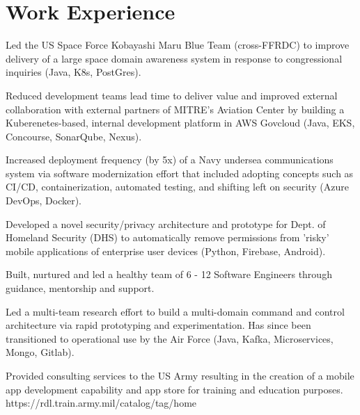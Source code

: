 \documentclass[]{deedy-resume-openfont}
\begin{document}
\section{Work Experience}
\hfill {}
\begin{tightemize}
	\item Led the US Space Force Kobayashi Maru Blue Team (cross-FFRDC) to improve delivery of a large space domain awareness system in response to congressional inquiries (Java, K8s, PostGres).   
	\item Reduced development teams lead time to deliver value and improved external collaboration with external partners of MITRE's Aviation Center by building a Kuberenetes-based, internal development platform in AWS Govcloud (Java, EKS, Concourse, SonarQube, Nexus).  
    \item Increased deployment frequency (by 5x) of a Navy undersea communications system via software modernization effort that included adopting concepts such as CI/CD, containerization, automated testing, and shifting left on security (Azure DevOps, Docker).
	\item Developed a novel security/privacy architecture and prototype for Dept. of Homeland Security (DHS) to automatically remove permissions from 'risky' mobile applications of enterprise user devices (Python, Firebase, Android).
\end{tightemize}
\sectionsep
{}\hfill {}
\begin{tightemize}
	\item Built, nurtured and led a healthy team of 6 - 12 Software Engineers through guidance, mentorship and support.
\end{tightemize}
\sectionsep
{}\hfill {}
\begin{tightemize}
	\item Led a multi-team research effort to build a multi-domain command and control architecture via rapid prototyping and experimentation. Has since been transitioned to operational use by the Air Force (Java, Kafka, Microservices, Mongo, Gitlab).
	\item Provided consulting services to the US Army resulting in the creation of a mobile app development capability and app store for training and education purposes.  https://rdl.train.army.mil/catalog/tag/home
\end{tightemize}
\end{document}
